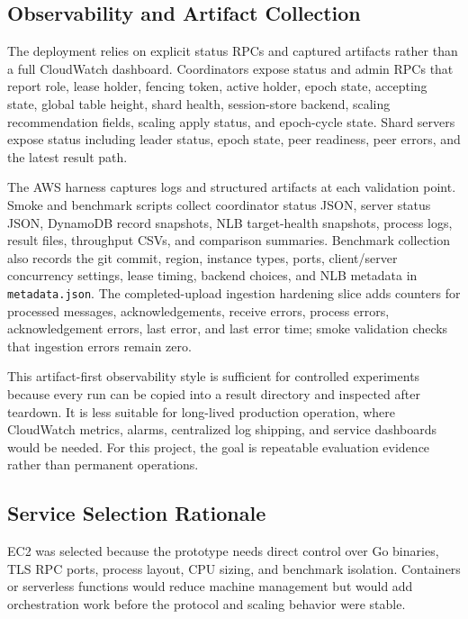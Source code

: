 \documentclass[conference]{IEEEtran}
\begin{document}
\subsection{Observability and Artifact Collection}

The deployment relies on explicit status RPCs and captured artifacts rather than a full CloudWatch dashboard. Coordinators expose status and admin RPCs that report role, lease holder, fencing token, active holder, epoch state, accepting state, global table height, shard health, session-store backend, scaling recommendation fields, scaling apply status, and epoch-cycle state. Shard servers expose status including leader status, epoch state, peer readiness, peer errors, and the latest result path.

The AWS harness captures logs and structured artifacts at each validation point. Smoke and benchmark scripts collect coordinator status JSON, server status JSON, DynamoDB record snapshots, NLB target-health snapshots, process logs, result files, throughput CSVs, and comparison summaries. Benchmark collection also records the git commit, region, instance types, ports, client/server concurrency settings, lease timing, backend choices, and NLB metadata in \texttt{metadata.json}. The completed-upload ingestion hardening slice adds counters for processed messages, acknowledgements, receive errors, process errors, acknowledgement errors, last error, and last error time; smoke validation checks that ingestion errors remain zero.

This artifact-first observability style is sufficient for controlled experiments because every run can be copied into a result directory and inspected after teardown. It is less suitable for long-lived production operation, where CloudWatch metrics, alarms, centralized log shipping, and service dashboards would be needed. For this project, the goal is repeatable evaluation evidence rather than permanent operations.

\subsection{Service Selection Rationale}

EC2 was selected because the prototype needs direct control over Go binaries, TLS RPC ports, process layout, CPU sizing, and benchmark isolation. Containers or serverless functions would reduce machine management but would add orchestration work before the protocol and scaling behavior were stable.
\end{document}
